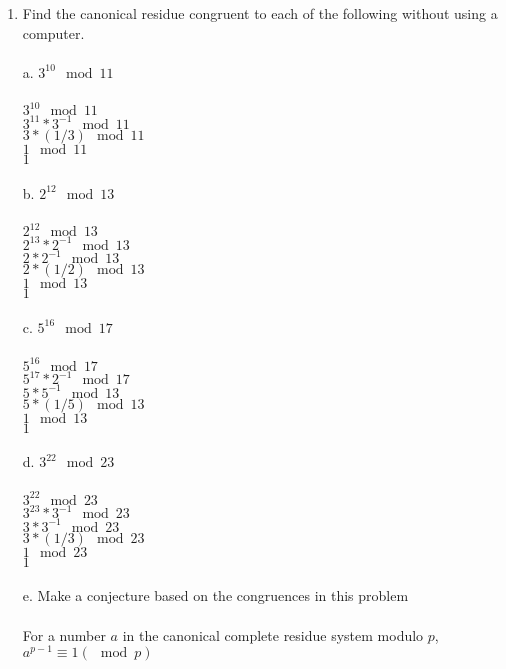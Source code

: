 \documentclass[]{article}
\begin{document}
\begin{enumerate}
    \item Find the canonical residue congruent to each of the following without using a computer.
    \\\\a. $3^{10} \mod 11$
    \\\\$3^{10} \mod 11$
    \\$3^{11} * 3^{-1} \mod 11$
    \\$3 * (1/3)  \mod 11$
    \\$1 \mod 11$
    \\$1$
    \\\\b. $2^{12} \mod 13$
    \\\\$2^{12} \mod 13$
    \\$2^{13} * 2^{-1} \mod 13$
    \\$2 * 2^{-1} \mod 13$
    \\$2 * (1/2) \mod 13$
    \\$1 \mod 13$
    \\$1$
    \\\\c. $5^{16} \mod 17$
    \\\\$5^{16} \mod 17$
    \\$5^{17} * 2^{-1} \mod 17$
    \\$5 * 5^{-1} \mod 13$
    \\$5 * (1/5) \mod 13$
    \\$1 \mod 13$
    \\$1$
    \\\\d. $3^{22} \mod 23$
    \\\\$3^{22} \mod 23$
    \\$3^{23} * 3^{-1} \mod 23$
    \\$3 * 3^{-1} \mod 23$
    \\$3 * (1/3) \mod 23$
    \\$1 \mod 23$
    \\$1$
    \\\\e. Make a conjecture based on the congruences in this problem
    \\\\For a number $a$ in the canonical complete residue system modulo $p$, $a^{p-1} \equiv 1 ( \mod p)$ 
    
\end{enumerate}
\end{document}
